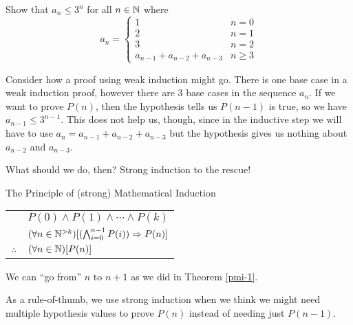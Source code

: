 \documentclass[main.tex]{subfiles}
\begin{document}
\begin{example}
	\label{first-strong-proof}
	Show that \(a_n \leq 3^n\) for all \(n \in \mathbb{N}\) where \[a_n = \begin{cases} 1 & n=0 \\ 2 & n=1 \\ 3 & n=2 \\ a_{n-1} + a_{n-2} + a_{n-3} & n \geq 3 \end{cases}\]
	
	Consider how a proof using weak induction might go. There is one base case in a weak induction proof, however there are 3 base cases in the sequence \(a_n\). If we want to prove \(P(n)\), then the hypothesis tells us \(P(n-1)\) is true, so we have \(a_{n-1} \leq 3^{n-1}\). This does not help us, though, since in the inductive step we will have to use \(a_n = a_{n-1} + a_{n-2} + a_{n-3}\) but the hypothesis gives us nothing about \(a_{n-2}\) and \(a_{n-3}\).
	
	What should we do, then? Strong induction to the rescue!
\end{example}

\begin{thm}{The Principle of (strong) Mathematical Induction \label{psi}}
	\begin{center}
		\begin{tabular}{rl}
			& \(P(0) \land P(1) \land \cdots \land P(k)\) \\
			& \((\forall n \in \mathbb{N}^{> k})[(\bigwedge_{i=0}^{n-1} P(i)) \Rightarrow P(n)]\) \\
			\midrule
			\(\therefore\) & \((\forall n \in \mathbb{N})[P(n)]\) \\
		\end{tabular}
	\end{center}
\end{thm}

\begin{rem}
	We can ``go from'' \(n\) to \(n+1\) as we did in Theorem \ref{pmi-1}.
\end{rem}

As a rule-of-thumb, we use strong induction when we think we might need multiple hypothesis values to prove \(P(n)\) instead of needing just \(P(n-1)\).
\end{document}
